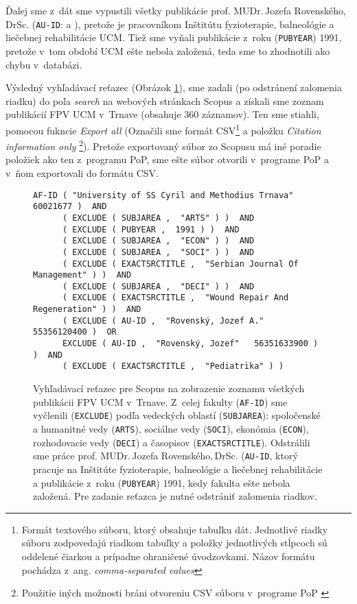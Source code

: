 Ďalej sme z~dát sme vypustili všetky publikácie prof. MUDr.\,Jozefa
Rovenského,\,DrSc.  (\texttt{AU-ID}:  a ), pretože je pracovníkom Inštitútu fyzioterapie, balneológie a
liečebnej rehabilitácie UCM. Tiež sme vyňali publikácie z~roku
(\texttt{PUBYEAR}) 1991, pretože v~tom období UCM ešte nebola založená, teda sme
to zhodnotili ako chybu v~databázi.

Výsledný vyhľadávací reťazec (Obrázok \ref{fig:scopus.query}), sme zadali (po
odstránení zalomenia riadku) do poľa \emph{search} na webových stránkach Scopus
a získali sme zoznam publikácií FPV UCM v~Trnave (obsahuje 360 záznamov). Ten
sme stiahli, pomocou fukncie \emph{Export all} (Označili sme formát
CSV\footnote{Formát textového súboru, ktorý obsahuje tabuľku dát. Jednotlivé
  riadky súboru zodpovedajú riadkom tabuľky a položky jednotlivých stĺpcoch sú
  oddelené čiarkou a prípadne ohraničené úvodzovkami.  Názov formátu pochádza
  z~ang.  \emph{comma-separated values}} a položku \emph{Citation information
  only} \footnote {Použitie iných možnosti bráni otvoreniu CSV súboru v~programe
  PoP \citep{Harzing2011}}).  Pretože exportovaný súbor zo Scopusu má iné
poradie položiek ako ten z~programu PoP, sme ešte súbor otvorili v~programe PoP
a v~ňom exportovali do formátu CSV.


\begin{figure}
  \footnotesize
  \begin{Verbatim}[frame=single]
    AF-ID ( "University of SS Cyril and Methodius Trnava"   60021677 )  AND
      ( EXCLUDE ( SUBJAREA ,  "ARTS" ) )  AND
      ( EXCLUDE ( PUBYEAR ,  1991 ) )  AND
      ( EXCLUDE ( SUBJAREA ,  "ECON" ) )  AND
      ( EXCLUDE ( SUBJAREA ,  "SOCI" ) )  AND
      ( EXCLUDE ( EXACTSRCTITLE ,  "Serbian Journal Of Management" ) )  AND
      ( EXCLUDE ( SUBJAREA ,  "DECI" ) )  AND
      ( EXCLUDE ( EXACTSRCTITLE ,  "Wound Repair And Regeneration" ) )  AND
      ( EXCLUDE ( AU-ID ,  "Rovenský, Jozef A."   55356120400 )  OR
      EXCLUDE ( AU-ID ,  "Rovenský, Jozef"   56351633900 ) )  AND
      ( EXCLUDE ( EXACTSRCTITLE ,  "Pediatrika" ) )
  \end{Verbatim}
  \vspace*{-4mm}
  \caption[Vyhľahávaci reťazec pre celú fakultu pre Scopus]%
  {Vyhľadávací reťazec pre Scopus na zobrazenie zoznamu všetkých publikácii FPV
    UCM v~Trnave.  Z~celej fakulty (\texttt{AF-ID}) sme vyčlenili
    (\texttt{EXCLUDE}) podľa vedeckých oblastí (\texttt{SUBJAREA}): spoločenské
    a humanitné vedy (\texttt{ARTS}), sociálne vedy (\texttt{SOCI}), ekonómia
    (\texttt{ECON}), rozhodovacie vedy (\texttt{DECI}) a časopisov
    (\texttt{EXACTSRCTITLE}).  Odstrálili sme práce prof. MUDr.\,Jozefa
    Rovenského,\,DrSc.  (\texttt{AU-ID}, ktorý pracuje na Inštitúte
    fyzioterapie, balneológie a liečebnej rehabilitácie a publikácie z~roku
    (\texttt{PUBYEAR}) 1991, kedy fakulta ešte nebola založená. Pre zadanie
    reťazca je nutné odstrániť zalomenia riadkov.}
  \label{fig:scopus.query}
\end{figure}


